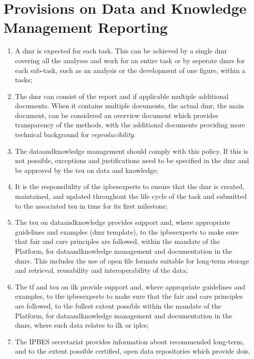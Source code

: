 \documentclass{article}
\begin{document}
\section{Provisions on Data and Knowledge Management Reporting}


\begin{enumerate}[label=(\alph*)]
    \item A \gls{dmr} is expected for each \gls{task}. This can be achieved by a single \gls{dmr} covering all the analyses and work for an entire \gls{task} or by seperate \glspl{dmr} for each sub-\gls{task}, such as an analysis or the development of one figure, within a \glspl{task};

    \item The \gls{dmr} can consist of the report and if applicable multiple additional documents. When it contains multiple documents, the actual \gls{dmr}, the main document, can be considered an overview document which provides transparency of the methods, with the additional documents providing more technical background for \textit{reproducibility}.

    \item The \gls{dataandknowledge} management should comply with this policy. If this is not possible, exceptions and justifications need to be specified in the \gls{dmr} and be approved by the \gls{tsu} on data and knowledge;

    \item It is the responsibility of the \glspl{ipbesexpert} to ensure that the \gls{dmr} is created, maintained, and updated throughout the life cycle of the \gls{task} and submitted to the associated \gls{tsu} in time for its first \gls{milestone};

    \item The  \gls{tsu} on \gls{dataandknowledge} provides support and, where appropriate guidelines and examples (\gls{dmr}  template), to the \glspl{ipbesexpert} to make sure that \gls{fair} and \gls{care} principles are followed, within the mandate of the Platform, for \gls{dataandknowledge} management and documentation in the \glspl{dmr}. This includes the use of open file formats suitable for long-term storage and retrieval, reusability and interoperability of the \gls{data};

    \item The \gls{tf} and \gls{tsu} on \gls{ilk} provide support and, where appropriate guidelines and examples, to the \glspl{ipbesexpert} to make sure that the \gls{fair} and \gls{care} principles are followed, to the fullest extent possible within the mandate of the Platform, for \gls{dataandknowledge} management and documentation in the \glspl{dmr}, where such \gls{data} relates to \gls{ilk} or \glspl{iplc};

    \item The IPBES \gls{secretariat} provides information about recommended long-term, and to the extent possible certified, open \gls{data} repositories which provide \glspl{doi}.
\end{enumerate}
\end{document}
